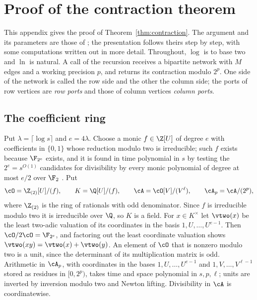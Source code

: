 
\appendix

\section{Proof of the contraction theorem}\label{app:contraction}

This appendix gives the proof of Theorem~\ref{thm:contraction}. The argument
and its parameters are those of \oai{} \cite[Appendix D.4]{OAI26}; the
presentation follows theirs step by step, with some computations written out
in more detail. Throughout, $\log$ is to base two and $\ln$ is natural. A call
of the recursion receives a bipartite network with $M$ edges and a working
precision $p$, and returns its contraction modulo $2^p$. One side of the
network is called the row side and the other the column side; the ports of
row vertices are \emph{row ports} and those of column vertices \emph{column
ports}.

\subsection{The coefficient ring}\label{app:ring}
Put $\lambda=\lceil\log s\rceil$ and $e=4\lambda$. Choose a monic $f\in\Z[U]$ of
degree $e$ with coefficients in $\{0,1\}$ whose reduction modulo two is
irreducible; such $f$ exists because $\F_{2^e}$ exists, and it is found in time
polynomial in $s$ by testing the $2^e=s^{O(1)}$ candidates for divisibility by
every monic polynomial of degree at most $e/2$ over $\F_2$ \cite{vzGG13}. Put
\[
\cO=\Z_{(2)}[U]/(f),\qquad K=\Q[U]/(f),\qquad \cA=\cO[V]/(V^\ell),\qquad
\cA_p=\cA/(2^p),
\]
where $\Z_{(2)}$ is the ring of rationals with odd denominator. Since $f$ is
irreducible modulo two it is irreducible over $\Q$, so $K$ is a field. For
$x\in K^\times$ let $\vtwo(x)$ be the least two-adic valuation of its coordinates
in the basis $1,U,\dots,U^{e-1}$. Then $\cO/2\cO=\F_{2^e}$, and factoring out the
least coordinate valuation shows $\vtwo(xy)=\vtwo(x)+\vtwo(y)$. An element of
$\cO$ that is nonzero modulo two is a unit, since the determinant of its
multiplication matrix is odd. Arithmetic in $\cA_p$, with coordinates in the
bases $1,U,\dots,U^{e-1}$ and $1,V,\dots,V^{\ell-1}$ stored as residues in
$[0,2^p)$, takes time and space polynomial in $s,p,\ell$; units are inverted by
inversion modulo two and Newton lifting. Divisibility in $\cA$ is coordinatewise.

